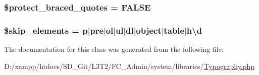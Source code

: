 \subsubsection[{\$protect\+\_\+braced\+\_\+quotes}]{\setlength{\rightskip}{0pt plus 5cm}\$protect\+\_\+braced\+\_\+quotes = F\+A\+L\+S\+E}\label{class_c_i___typography_a6a74364571da23cc7187c864cde167ca}
\hypertarget{class_c_i___typography_a80c70a349bff88ad1ef94dea8753bc2e}{}
\subsubsection[{\$skip\+\_\+elements}]{\setlength{\rightskip}{0pt plus 5cm}\$skip\+\_\+elements = \textquotesingle{}p$\vert$pre$\vert$ol$\vert$ul$\vert$dl$\vert$object$\vert$table$\vert${\bf h\textbackslash{}d}\textquotesingle{}}\label{class_c_i___typography_a80c70a349bff88ad1ef94dea8753bc2e}


The documentation for this class was generated from the following file\+:\begin{DoxyCompactItemize}
\item 
D\+:/xampp/htdocs/\+S\+D\+\_\+\+Git/\+L3\+T2/\+F\+C\+\_\+\+Admin/system/libraries/\hyperlink{_typography_8php}{Typography.\+php}\end{DoxyCompactItemize}

